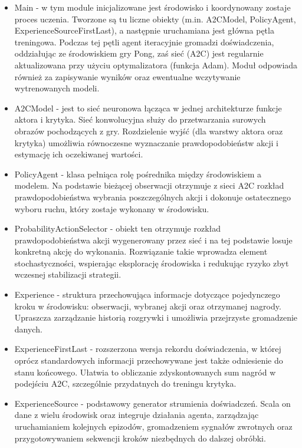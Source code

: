 \documentclass[a4paper, 12pt]{article}
\numberwithin{equation}{section}
\begin{document}
    \begin{itemize}
        \item Main - w tym module inicjalizowane jest środowisko i koordynowany zostaje proces uczenia. Tworzone są tu liczne obiekty (m.in. A2CModel, PolicyAgent, ExperienceSourceFirstLast), a następnie uruchamiana jest główna pętla treningowa. Podczas tej pętli agent iteracyjnie gromadzi doświadczenia, oddziałując ze środowiskiem gry Pong, zaś sieć (A2C) jest regularnie aktualizowana przy użyciu optymalizatora (funkcja Adam). Moduł odpowiada również za zapisywanie wyników oraz ewentualne wczytywanie wytrenowanych modeli.
        \item A2CModel - jest to sieć neuronowa łącząca w jednej architekturze funkcje aktora i krytyka. Sieć konwolucyjna służy do przetwarzania surowych obrazów pochodzących z gry. Rozdzielenie wyjść (dla warstwy aktora oraz krytyka) umożliwia równoczesne wyznaczanie prawdopodobieństw akcji i estymację ich oczekiwanej wartości.
        \item PolicyAgent - klasa pełniąca rolę pośrednika między środowiskiem a modelem. Na podstawie bieżącej obserwacji otrzymuje z sieci A2C rozkład prawdopodobieństwa wybrania poszczególnych akcji i dokonuje ostatecznego wyboru ruchu, który zostaje wykonany w środowisku.
        \item ProbabilityActionSelector - obiekt ten otrzymuje rozkład prawdopodobieństwa akcji wygenerowany przez sieć i na tej podstawie losuje konkretną akcję do wykonania. Rozwiązanie takie wprowadza element stochastyczności, wspierając eksplorację środowiska i redukując ryzyko zbyt wczesnej stabilizacji strategii.
        \item Experience - struktura przechowująca informacje dotyczące pojedynczego kroku w środowisku: obserwacji, wybranej akcji oraz otrzymanej nagrody. Upraszcza zarządzanie historią rozgrywki i umożliwia przejrzyste gromadzenie danych.
        \item ExperienceFirstLast - rozszerzona wersja rekordu doświadczenia, w której oprócz standardowych informacji przechowywane jest także odniesienie do stanu końcowego. Ułatwia to obliczanie zdyskontowanych sum nagród w podejściu A2C, szczególnie przydatnych do treningu krytyka.
        \item ExperienceSource - podstawowy generator strumienia doświadczeń. Scala on dane z wielu środowisk oraz integruje działania agenta, zarządzając uruchamianiem kolejnych epizodów, gromadzeniem sygnałów zwrotnych oraz przygotowywaniem sekwencji kroków niezbędnych do dalszej obróbki.

\end{itemize}
\end{document}
